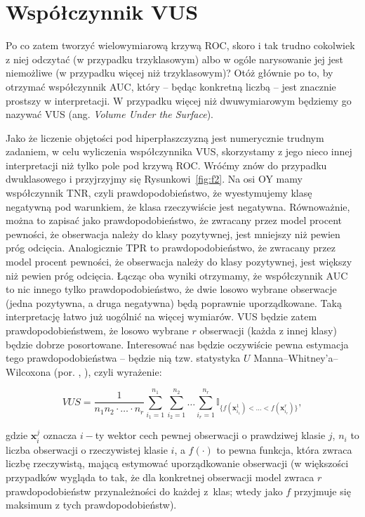 \documentclass{mini}
\begin{document}
\section{Współczynnik VUS}

Po co zatem tworzyć wielowymiarową krzywą ROC, skoro i tak trudno cokolwiek z niej odczytać (w przypadku trzyklasowym) albo w ogóle narysowanie jej jest niemożliwe (w przypadku więcej niż trzyklasowym)? Otóż głównie po to, by otrzymać współczynnik AUC, który -- będąc konkretną liczbą -- jest znacznie prostszy w interpretacji. W przypadku więcej niż dwuwymiarowym będziemy go nazywać VUS (ang. \textit{Volume Under the Surface}). 

Jako że liczenie objętości pod hiperpłaszczyzną jest numerycznie trudnym zadaniem, w celu wyliczenia współczynnika VUS, skorzystamy z jego nieco innej interpretacji niż tylko pole pod krzywą ROC. Wróćmy znów do przypadku dwuklasowego i przyjrzyjmy się Rysunkowi~\ref{fig:f2}. Na osi OY mamy współczynnik TNR, czyli prawdopodobieństwo, że wyestymujemy klasę negatywną pod warunkiem, że klasa rzeczywiście jest negatywna. Równoważnie, można to zapisać jako prawdopodobieństwo, że zwracany przez model procent pewności, że obserwacja należy do klasy pozytywnej, jest mniejszy niż pewien próg odcięcia. Analogicznie TPR to prawdopodobieństwo, że zwracany przez model procent pewności, że obserwacja należy do klasy pozytywnej, jest większy niż pewien próg odcięcia. Łącząc oba wyniki otrzymamy, że współczynnik AUC to nic innego tylko prawdopodobieństwo, że dwie losowo wybrane obserwacje (jedna pozytywna, a druga negatywna) będą poprawnie uporządkowane. Taką interpretację łatwo już uogólnić na więcej wymiarów. VUS będzie zatem prawdopodobieństwem, że losowo wybrane $r$ obserwacji (każda z innej klasy) będzie dobrze posortowane. Interesować nas będzie oczywiście pewna estymacja tego prawdopodobieństwa -- będzie nią tzw. statystyka $U$  Manna–Whitney'a–Wilcoxona (por. \cite{roc2}, \cite{roc1}), czyli wyrażenie:

\begin{equation}\label{dop3}
VUS = \dfrac{1}{n_1n_2\cdot\ldots\cdot n_r}\sum_{i_1=1}^{n_1}\sum_{i_2=1}^{n_2}\ldots\sum_{i_r=1}^{n_r}\mathbb{I}_{\lbrace f(\mathbf{x}_{i_1}^1)<\ldots<f(\mathbf{x}_{i_r}^r)\rbrace},
\end{equation}

gdzie $\textbf{x}_i^j$ oznacza $i-$ty wektor cech pewnej obserwacji o prawdziwej klasie $j$, $n_i$ to liczba obserwacji o rzeczywistej klasie $i$, a $f(\cdot)$ to pewna funkcja, która zwraca liczbę rzeczywistą, mającą estymować uporządkowanie obserwacji (w większości przypadków wygląda to tak, że dla konkretnej obserwacji model zwraca $r$ prawdopodobieństw przynależności do każdej z~klas; wtedy jako $f$ przyjmuje się maksimum z tych prawdopodobieństw).
\end{document}
